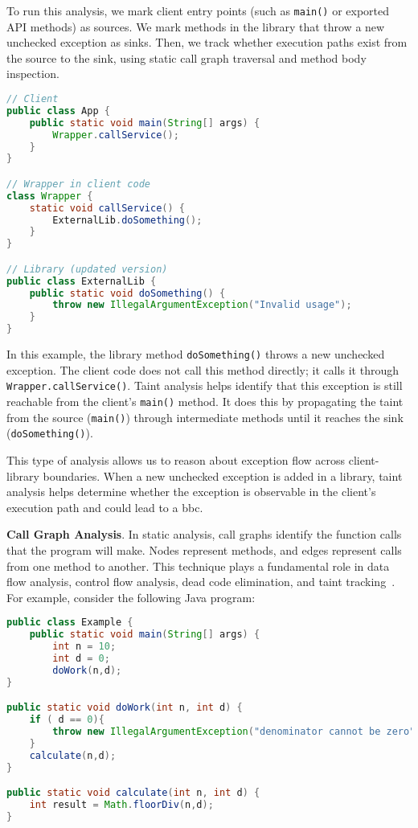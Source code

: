 To run this analysis, we mark client entry points (such as \texttt{main()} or exported API methods) as sources. We mark methods in the library that throw a new unchecked exception as sinks. Then, we track whether execution paths exist from the source to the sink, using static call graph traversal and method body inspection.

\begin{lstlisting}[language=java]
// Client
public class App {
    public static void main(String[] args) {
        Wrapper.callService();
    }
}

// Wrapper in client code
class Wrapper {
    static void callService() {
        ExternalLib.doSomething();
    }
}

// Library (updated version)
public class ExternalLib {
    public static void doSomething() {
        throw new IllegalArgumentException("Invalid usage");
    }
}
\end{lstlisting}

In this example, the library method \texttt{doSomething()} throws a new unchecked exception. The client code does not call this method directly; it calls it through \texttt{Wrapper.callService()}. Taint analysis helps identify that this exception is still reachable from the client’s \texttt{main()} method. It does this by propagating the taint from the source (\texttt{main()}) through intermediate methods until it reaches the sink (\texttt{doSomething()}).

This type of analysis allows us to reason about exception flow across client-library boundaries. When a new unchecked exception is added in a library, taint analysis helps determine whether the exception is observable in the client’s execution path and could lead to a \gls{bbc}.


\textbf{Call Graph Analysis}. In static analysis, call graphs identify the function calls that the
program will make. Nodes represent methods, and edges represent calls from one method to another.
This technique plays a fundamental role in data flow analysis, control flow analysis,
dead code elimination, and taint tracking~\cite{Keshani2024}.
For example, consider the following Java program:
\begin{lstlisting}[language=java]
public class Example {
    public static void main(String[] args) {
        int n = 10;
        int d = 0;
        doWork(n,d);
}

public static void doWork(int n, int d) {
    if ( d == 0){
        throw new IllegalArgumentException("denominator cannot be zero");
    }
    calculate(n,d);
}

public static void calculate(int n, int d) {
    int result = Math.floorDiv(n,d);
}
\end{lstlisting}

